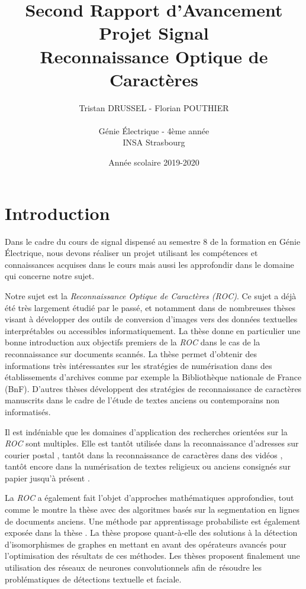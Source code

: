 \documentclass[a4paper,12pt,titlepage]{report}
\title{Second Rapport d'Avancement Projet Signal\\Reconnaissance Optique de Caractères}
\author{Tristan DRUSSEL - Florian POUTHIER \\ \\ Génie Électrique - 4ème année\\ INSA Strasbourg}
\date{Année scolaire 2019-2020}
\begin{document}
	\begin{titlepage}
		\maketitle
	\end{titlepage}
	\tableofcontents
	\newpage
	\section{Introduction}
	
	\vspace{-0.5em}
	
		Dans le cadre du cours de signal dispensé au semestre 8 de la formation en Génie Électrique, nous devons réaliser un projet utilisant les compétences et connaissances acquises dans le cours mais aussi les approfondir dans le domaine qui concerne notre sujet.
		
		Notre sujet est la \textit{Reconnaissance Optique de Caractères (ROC)}. Ce sujet a déjà été très largement étudié par le passé, et notamment dans de nombreuses thèses visant à développer des outils de conversion d'images vers des données textuelles interprétables ou accessibles informatiquement. La thèse \cite{extr} donne en particulier une bonne introduction aux objectifs premiers de la \textit{ROC} dans le cas de la reconnaissance sur documents scannés. La thèse \cite{mait} permet d'obtenir des informations très intéressantes sur les stratégies de numérisation dans des établissements d'archives comme par exemple la Bibliothèque nationale de France (BnF). D'autres thèses \cite{handrec, chanson} développent des stratégies de reconnaissance de caractères manuscrits dans le cadre de l'étude de textes anciens ou contemporains non informatisés.
		
		Il est indéniable que les domaines d'application des recherches orientées sur la \textit{ROC} sont multiples. Elle est tantôt utilisée dans la reconnaissance d'adresses sur courier postal \cite{ind-post}, tantôt dans la reconnaissance de caractères dans des vidéos \cite{arab-video}, tantôt encore dans la numérisation de textes religieux ou anciens consignés sur papier jusqu'à présent \cite{chanson}.
		
		La \textit{ROC} a également fait l'objet d'approches mathématiques approfondies, tout comme le montre la thèse \cite{line-seg} avec des algoritmes basés sur la segmentation en lignes de documents anciens. Une méthode par apprentissage probabiliste est également exposée dans la thèse \cite{proba}. La thèse \cite{isom} propose quant-à-elle des solutions à la détection d'isomorphismes de graphes en mettant en avant des opérateurs avancés pour l'optimisation des résultats de ces méthodes. Les thèses \cite{handrec, cnn} proposent finalement une utilisation des réseaux de neurones convolutionnels afin de résoudre les problématiques de détections textuelle et faciale.
		
\end{document}
